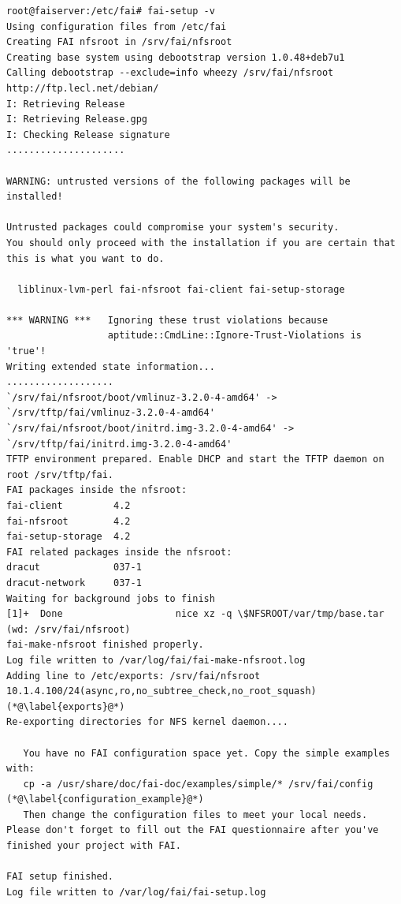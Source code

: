 \documentclass[11pt
  , a4paper
  , article
  , oneside
]{memoir}
\begin{document}
\begin{lstlisting}[style=termstylenumber, caption={fai-setup output}, label={list:fai-setup-output}]
root@faiserver:/etc/fai# fai-setup -v
Using configuration files from /etc/fai
Creating FAI nfsroot in /srv/fai/nfsroot
Creating base system using debootstrap version 1.0.48+deb7u1
Calling debootstrap --exclude=info wheezy /srv/fai/nfsroot http://ftp.lecl.net/debian/
I: Retrieving Release
I: Retrieving Release.gpg
I: Checking Release signature
.....................

WARNING: untrusted versions of the following packages will be installed!

Untrusted packages could compromise your system's security.
You should only proceed with the installation if you are certain that
this is what you want to do.

  liblinux-lvm-perl fai-nfsroot fai-client fai-setup-storage 

*** WARNING ***   Ignoring these trust violations because
                  aptitude::CmdLine::Ignore-Trust-Violations is 'true'!
Writing extended state information...
...................
`/srv/fai/nfsroot/boot/vmlinuz-3.2.0-4-amd64' -> `/srv/tftp/fai/vmlinuz-3.2.0-4-amd64'
`/srv/fai/nfsroot/boot/initrd.img-3.2.0-4-amd64' -> `/srv/tftp/fai/initrd.img-3.2.0-4-amd64'
TFTP environment prepared. Enable DHCP and start the TFTP daemon on root /srv/tftp/fai.
FAI packages inside the nfsroot:
fai-client         4.2
fai-nfsroot        4.2
fai-setup-storage  4.2
FAI related packages inside the nfsroot:
dracut             037-1
dracut-network     037-1
Waiting for background jobs to finish
[1]+  Done                    nice xz -q \$NFSROOT/var/tmp/base.tar  (wd: /srv/fai/nfsroot)
fai-make-nfsroot finished properly.
Log file written to /var/log/fai/fai-make-nfsroot.log
Adding line to /etc/exports: /srv/fai/nfsroot 10.1.4.100/24(async,ro,no_subtree_check,no_root_squash) (*@\label{exports}@*) 
Re-exporting directories for NFS kernel daemon....

   You have no FAI configuration space yet. Copy the simple examples with:
   cp -a /usr/share/doc/fai-doc/examples/simple/* /srv/fai/config (*@\label{configuration_example}@*) 
   Then change the configuration files to meet your local needs.
Please don't forget to fill out the FAI questionnaire after you've finished your project with FAI.

FAI setup finished.
Log file written to /var/log/fai/fai-setup.log
\end{lstlisting}
\end{document}
